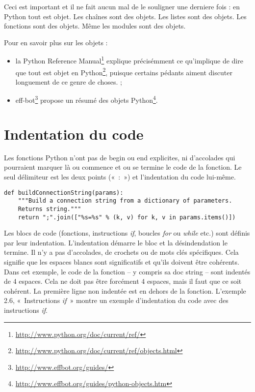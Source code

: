 \medskip
Ceci est important et il ne fait aucun mal de le souligner une derniere fois : en Python tout est objet. Les chaînes sont des objets. Les listes sont des objets. Les fonctions sont des objets. Même les modules sont des objets.

\medskip
\noindent Pour en savoir plus sur les objets :
\begin{itemize}
\item{la Python Reference Manual\footnote{\url{http://www.python.org/doc/current/ref/}} explique précisémment ce qu'implique de dire que tout est objet en Python\footnote{\url{http://www.python.org/doc/current/ref/objects.html}}, puisque certains pédants aiment discuter longuement de ce genre de choses.} ;
\item{eff-bot\footnote{\url{http://www.effbot.org/guides/}} propose un résumé des objets Python\footnote{\url{http://www.effbot.org/guides/python-objects.htm}}.}
\end{itemize}

\section{Indentation du code}

Les fonctions Python n'ont pas de begin ou end explicites, ni d'accolades qui pourraient marquer là ou commence et ou se termine le code de la fonction. Le seul délimiteur est les deux points («~:~») et l'indentation du code lui-même.

\begin{example}
\begin{lstlisting}
def buildConnectionString(params):
    """Build a connection string from a dictionary of parameters.
    Returns string."""
    return ";".join(["%s=%s" % (k, v) for k, v in params.items()])
\end{lstlisting}
\end{example}

Les blocs de code (fonctions, instructions \emph{if}, boucles \emph{for} ou \emph{while} etc.) sont définis par leur indentation. L'indentation démarre le bloc et la désindendation le termine. Il n'y a pas d'accolades, de crochets ou de mots clés spécifiques. Cela signifie que les espaces blancs sont significatifs et qu'ils doivent être cohérents. Dans cet exemple, le code de la fonction -- y compris sa doc string -- sont indentés de 4 espaces. Cela ne doit pas être forcément 4 espaces, mais il faut que ce soit cohérent. La première ligne non indentée est en dehors de la fonction.
L'exemple 2.6, «~Instructions \emph{if}~» montre un exemple d'indentation du code avec des instructions \emph{if}.

